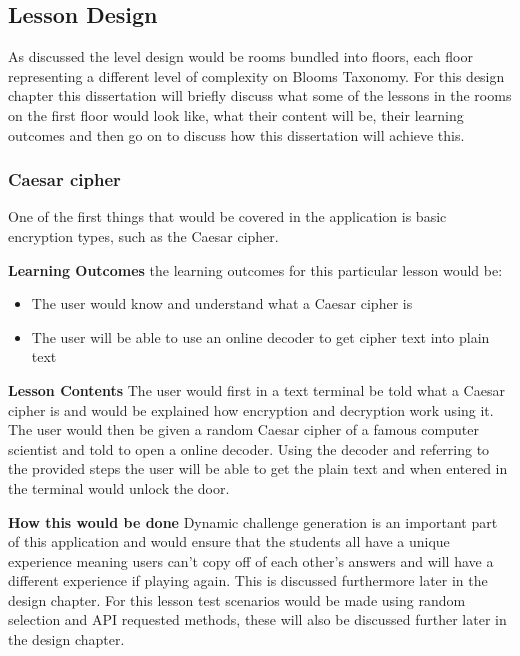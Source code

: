 \documentclass[12pt,a4paper]{article}
\begin{document}
\subsection{Lesson Design}  
As discussed the level design would be rooms bundled into floors, each floor representing a different level of complexity on Blooms Taxonomy. For this design chapter this dissertation will briefly discuss what some of the lessons in the rooms on the first floor would look like, what their content will be, their learning outcomes and then go on to discuss how this dissertation will achieve this. 
\subsubsection{Caesar cipher} 
One of the first things that would be covered in the application is basic encryption types, such as the Caesar cipher.  

\textbf{Learning Outcomes} 
\newline the learning outcomes for this particular lesson would be:  

\begin{itemize}\itemsep0pt
	\item The user would know and understand what a Caesar cipher is 
	\item The user will be able to use an online decoder to get cipher text into plain text
\end{itemize} 

\textbf{Lesson Contents} 
\newline The user would first in a text terminal be told what a Caesar cipher is and would be explained how encryption and decryption work using it. The user would then be given a random Caesar cipher of a famous computer scientist and told to open a online decoder. Using the decoder and referring to the provided steps the user will be able to get the plain text and when entered in the terminal would unlock the door.

\textbf{How this would be done} 
\newline Dynamic challenge generation is an important part of this application and would ensure that the students all have a unique experience meaning users can't copy off of each other's answers and will have a different experience if playing again. This is discussed furthermore later in the design chapter. For this lesson test scenarios would be made using random selection and API requested methods, these will also be discussed further later in the design chapter. 
\end{document}
